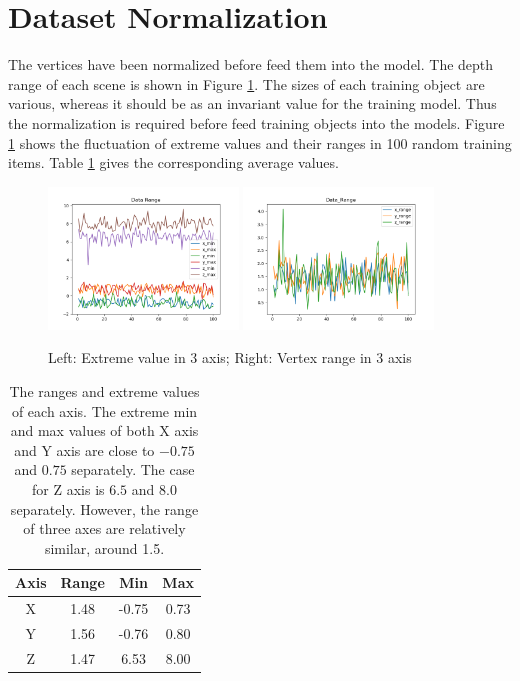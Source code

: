 \section{Dataset Normalization}

The vertices have been normalized before feed them into the model. The depth range of each scene is shown in Figure \ref{fig:data_range}.
The sizes of each training object are various, whereas it should be as an invariant value for the training model. Thus the normalization is required before feed training objects into the models. Figure \ref{fig:data_range} shows the fluctuation of extreme values and their ranges in 100 random training items. Table \ref{tab:data_range} gives the corresponding average values.
\begin{figure}[!h]
	\centering
	{\includegraphics[width=0.45\textwidth]{./pic/Data_Extreme.png}}
	{\includegraphics[width=0.45\textwidth]{./pic/Data_Range.png}}
	\label{fig:data_range}
	\caption{Left: Extreme value in 3 axis; Right: Vertex range in 3 axis}
\end{figure}

\begin{table}[!h]
	\centering
	\begin{tabular}{|c|c|c|c|}
		\hline
		Axis & Range & Min & Max\\
		\hline
		X & 1.48 & -0.75 & 0.73\\
		Y & 1.56 & -0.76 & 0.80\\
		Z & 1.47 & 6.53 & 8.00\\
		\hline
	\end{tabular}
	\caption{The ranges and extreme values of each axis. The extreme min and max values of both X axis and Y axis are close to $ -0.75 $ and $ 0.75 $ separately. The case for Z axis is $ 6.5 $ and $ 8.0 $ separately. However, the range of three axes are relatively similar, around 1.5. 
	}
	\label{tab:data_range}
\end{table}


